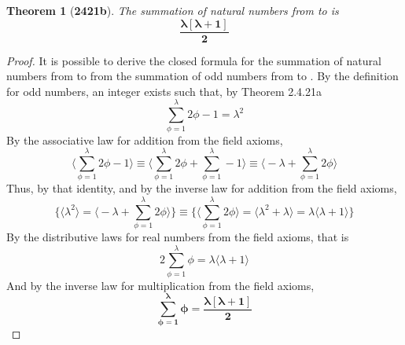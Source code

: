 \documentclass[preview]{standalone}
\newtheorem*{theorem*}{Theorem}
\begin{document}
\begin{theorem*}[\textbf{2421b}]
    The summation of natural numbers from  to \bm{$\lambda$} 
    is 
    \begin{equation*}
        \bm{
            \frac{ \lambda [ \lambda + 1 ]}{2}
        }
    \end{equation*}
\end{theorem*}

\begin{proof}
    It is possible to derive the closed formula for the summation of natural numbers
    from  to \bm{$\lambda$} 
    from the summation of odd numbers from  to \bm{$\lambda$}.
    By the definition for odd numbers, 
    an integer \bm{$\phi$} exists such that,
    by Theorem 2.4.21a
    \begin{equation*}
        \sum_{\phi=1}^\lambda 2 \phi - 1 
            = 
        \lambda ^2
    \end{equation*}
    By the associative law for addition from the field axioms,
    \begin{equation*}
        \bigg \langle \sum_{\phi=1}^\lambda 2 \phi - 1 \bigg \rangle
            \equiv
        \bigg \langle 
            \sum_{\phi=1}^\lambda 2 \phi 
                +
            \sum_{\phi=1}^\lambda - 1
        \bigg \rangle
            \equiv
        \bigg \langle 
            -\lambda 
                +
            \sum_{\phi=1}^\lambda 2 \phi 
        \bigg \rangle
    \end{equation*}
    Thus, by that identity, and by the inverse law for addition from the field axioms,
    \begin{equation*}
        \Bigg\{
            \bigg \langle \lambda ^2 \bigg \rangle
                = 
            \bigg \langle 
                -\lambda 
                    + 
                \sum_{\phi=1}^\lambda 2 \phi 
            \bigg \rangle
        \Bigg\}
            \equiv 
        \Bigg\{
            \bigg \langle \sum_{\phi=1}^\lambda 2 \phi \bigg \rangle 
                = 
            \bigg \langle \lambda ^2 + \lambda \bigg \rangle 
                = 
            \lambda \bigg \langle \lambda + 1 \bigg \rangle
        \Bigg\}
    \end{equation*}
    By the distributive laws for real numbers from the field axioms, that is
    \begin{equation*}
        2 \sum_{\phi=1}^\lambda \phi 
            = 
        \lambda \Big \langle \lambda + 1 \Big \rangle
    \end{equation*} 
    And by the inverse law for multiplication from the field axioms,
    \begin{equation*}
        \bm{
            \sum_{\phi=1}^\lambda \phi 
                = 
            \frac{ \lambda [ \lambda + 1 ] }{2}
        }
    \end{equation*}
\color{lightgray} \end{proof}
\end{document}
